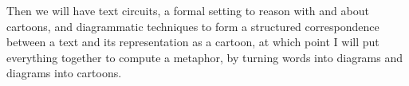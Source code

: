 Then we will have text circuits, a formal setting to reason with and about cartoons, and diagrammatic techniques to form a structured correspondence between a text and its representation as a cartoon, at which point I will put everything together to compute a metaphor, by turning words into diagrams and diagrams into cartoons.
